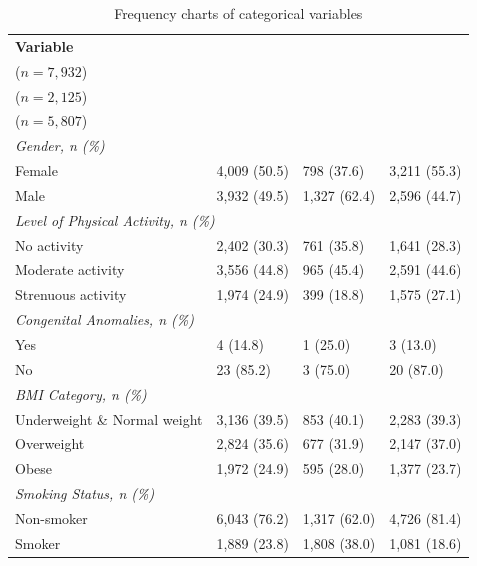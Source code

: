 \documentclass{article}
\begin{document}
\begin{table}[H]
\centering
\small
\renewcommand{\arraystretch}{1.15}
\begin{tabularx}{\textwidth}{|X|X|X|X|}
\toprule
\textbf{Variable} & 
\textbf{\begin{tabular}[l]{@{}l@{}}Overall\\ ($n = 7,932$)\end{tabular}} & 
\textbf{\begin{tabular}[l]{@{}l@{}}CAD\\ ($n = 2,125$)\end{tabular}} & 
\textbf{\begin{tabular}[l]{@{}l@{}}No CAD\\ ($n = 5,807$)\end{tabular}} \\
\midrule

\multicolumn{4}{l}{\textit{Gender, n (\%)}} \\
\quad Female & 4,009 (50.5) & 798 (37.6) & 3,211 (55.3) \\
\quad Male   & 3,932 (49.5) & 1,327 (62.4)   & 2,596 (44.7) \\[4pt]

\multicolumn{4}{l}{\textit{Level of Physical Activity, n (\%)}} \\
\quad No activity        & 2,402 (30.3) & 761 (35.8)   & 1,641 (28.3) \\
\quad Moderate activity  & 3,556 (44.8) & 965 (45.4) & 2,591 (44.6) \\
\quad Strenuous activity & 1,974 (24.9) & 399 (18.8)   & 1,575 (27.1)   \\[4pt]

\multicolumn{4}{l}{\textit{Congenital Anomalies, n (\%)}} \\
\quad Yes & 4 (14.8) & 1 (25.0)   & 3 (13.0) \\
\quad No  & 23 (85.2) & 3 (75.0) & 20 (87.0) \\[4pt]

\multicolumn{4}{l}{\textit{BMI Category, n (\%)}} \\
\quad Underweight \& Normal weight  & 3,136 (39.5) & 853 (40.1)     & 2,283 (39.3) \\
\quad Overweight                    & 2,824 (35.6) & 677 (31.9)     & 2,147 (37.0) \\
\quad Obese                         & 1,972 (24.9) & 595 (28.0)     & 1,377 (23.7)   \\[4pt]

\multicolumn{4}{l}{\textit{Smoking Status, n (\%)}} \\
\quad Non-smoker & 6,043 (76.2) & 1,317 (62.0) & 4,726 (81.4) \\
\quad Smoker     & 1,889 (23.8) & 1,808 (38.0) & 1,081 (18.6) \\
\bottomrule
\end{tabularx}
\caption{Frequency charts of categorical variables}
\label{tab:categorical_baseline}
\end{table}
\end{document}
